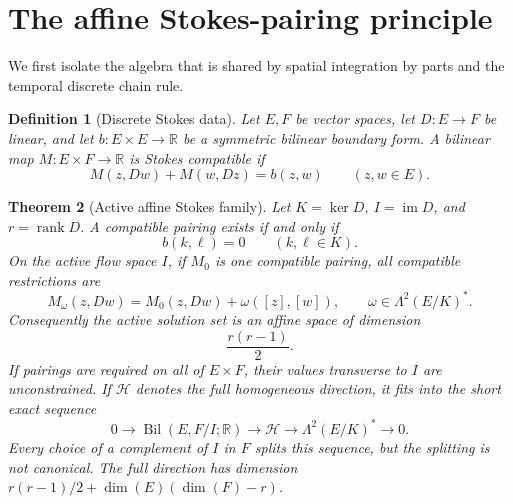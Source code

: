 \documentclass[11pt,a4paper]{article}
\newtheorem{theorem}{Theorem}[section]
\newtheorem{definition}[theorem]{Definition}
\newcommand{\R}{\mathbb R}
\begin{document}
\section{The affine Stokes-pairing principle}

We first isolate the algebra that is shared by spatial integration by parts
and the temporal discrete chain rule.

\begin{definition}[Discrete Stokes data]
Let \(E,F\) be vector spaces, let \(D:E\to F\) be linear, and let
\(b:E\times E\to\R\) be a symmetric bilinear boundary form. A bilinear
map \(M:E\times F\to\R\) is \emph{Stokes compatible} if
\begin{equation}\label{eq:stokes-compatibility}
 M(z,Dw)+M(w,Dz)=b(z,w)
 \qquad (z,w\in E).
\end{equation}
\end{definition}

\begin{theorem}[Active affine Stokes family]\label{thm:affine-stokes}
Let \(K=\ker D\), \(I=\operatorname{im}D\), and
\(r=\operatorname{rank}D\). A compatible pairing exists if and only if
\begin{equation}\label{eq:kernel-obstruction}
 b(k,\ell)=0\qquad(k,\ell\in K).
\end{equation}
On the active flow space \(I\), if \(M_0\) is one compatible pairing,
all compatible restrictions are
\begin{equation}\label{eq:abstract-gauge}
 M_\omega(z,Dw)=M_0(z,Dw)+\omega([z],[w]),
 \qquad \omega\in\Lambda^2(E/K)^*.
\end{equation}
Consequently the active solution set is an affine space of dimension
\begin{equation}\label{eq:active-dimension}
 \frac{r(r-1)}2.
\end{equation}
If pairings are required on all of \(E\times F\), their values transverse
to \(I\) are unconstrained.  If \(\mathcal H\) denotes the full
homogeneous direction, it fits into the short exact sequence
\begin{equation}\label{eq:full-affine-direction}
 0\longrightarrow \operatorname{Bil}(E,F/I;\R)
 \longrightarrow\mathcal H
 \longrightarrow\Lambda^2(E/K)^*
 \longrightarrow0.
\end{equation}
Every choice of a complement of \(I\) in \(F\) splits this sequence, but
the splitting is not canonical.  The full direction has dimension
\(r(r-1)/2+\dim(E)(\dim(F)-r)\).
\end{theorem}
\end{document}
